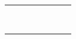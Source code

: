 \documentclass[a4paper]{ctexart}
\newcommand{\jn}{JN}
\begin{document}




\begin{longtable}[]{@{}lllllll@{}}
	\toprule
	\endhead
	& & & & & &\tabularnewline
	& & & & & &\tabularnewline
	& & & & & &\tabularnewline
	& & & & & &\tabularnewline
	& & & & & &\tabularnewline
	& & & & & &\tabularnewline
	& & & & & &\tabularnewline
	& & & & & &\tabularnewline
	\bottomrule
\end{longtable}
\end{document}
